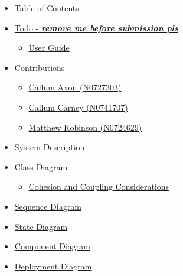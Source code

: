 \documentclass[
  english,
  a4paper,
,tablecaptionabove
]{scrartcl}
\providecommand{\tightlist}{%
  \setlength{\itemsep}{0pt}\setlength{\parskip}{0pt}}
\begin{document}
\begin{itemize}
\tightlist
\item
  \protect\hyperlink{table-of-contents}{Table of Contents}
\item
  \protect\hyperlink{todo---remove-me-before-submission-pls}{Todo -
  \textbf{\emph{remove me before submission pls}}}

  \begin{itemize}
  \tightlist
  \item
    \protect\hyperlink{user-guide}{User Guide}
  \end{itemize}
\item
  \protect\hyperlink{contributions}{Contributions}

  \begin{itemize}
  \tightlist
  \item
    \protect\hyperlink{callum-axon-n0727303}{Callum Axon (N0727303)}
  \item
    \protect\hyperlink{callum-carney-n0741707}{Callum Carney (N0741707)}
  \item
    \protect\hyperlink{matthew-robinson-n0724629}{Matthew Robinson
    (N0724629)}
  \end{itemize}
\item
  \protect\hyperlink{system-description}{System Description}
\item
  \protect\hyperlink{class-diagram}{Class Diagram}

  \begin{itemize}
  \tightlist
  \item
    \protect\hyperlink{cohesion-and-coupling-considerations}{Cohesion
    and Coupling Considerations}
  \end{itemize}
\item
  \protect\hyperlink{sequence-diagram}{Sequence Diagram}
\item
  \protect\hyperlink{state-diagram}{State Diagram}
\item
  \protect\hyperlink{component-diagram}{Component Diagram}
\item
  \protect\hyperlink{deployment-diagram}{Deployment Diagram}


\end{itemize}
\end{document}

